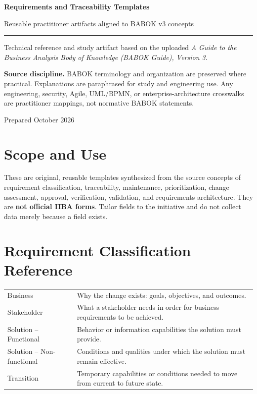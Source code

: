\documentclass[11pt]{article}
\begin{document}
\hypersetup{pageanchor=false}%
\begin{titlepage}
\centering
\vspace*{1.15in}
{\Huge\bfseries\color{BANavy} Requirements and Traceability Templates\par}
\vspace{0.35in}
{\Large\color{BAOrange} Reusable practitioner artifacts aligned to BABOK v3 concepts\par}
\vspace{0.55in}
\rule{0.78\textwidth}{1.2pt}\par
\vspace{0.35in}
{\large Technical reference and study artifact based on the uploaded \emph{A Guide to the Business Analysis Body of Knowledge (BABOK Guide), Version 3}.\par}
\vfill
\begin{keybox}
\textbf{Source discipline.} BABOK terminology and organization are preserved where practical. Explanations are paraphrased for study and engineering use. Any engineering, security, Agile, UML/BPMN, or enterprise-architecture crosswalks are practitioner mappings, not normative BABOK statements.
\end{keybox}
\vspace{0.35in}
{\small Prepared October 2026\par}
\end{titlepage}\hypersetup{pageanchor=true}
\tableofcontents
\newpage
\section{Scope and Use}
These are original, reusable templates synthesized from the source concepts of requirement classification, traceability, maintenance, prioritization, change assessment, approval, verification, validation, and requirements architecture. They are \textbf{not official IIBA forms}. Tailor fields to the initiative and do not collect data merely because a field exists.

\section{Requirement Classification Reference}
\begin{longtable}{L{0.20\textwidth} L{0.68\textwidth}}
\toprule
Business & Why the change exists: goals, objectives, and outcomes.\\
Stakeholder & What a stakeholder needs in order for business requirements to be achieved.\\
Solution -- Functional & Behavior or information capabilities the solution must provide.\\
Solution -- Non-functional & Conditions and qualities under which the solution must remain effective.\\
Transition & Temporary capabilities or conditions needed to move from current to future state.\\
\bottomrule
\end{longtable}
\end{document}
